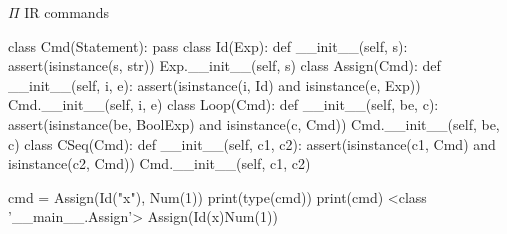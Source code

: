 \documentclass{beamer}
\begin{document}

\begin{frame}{{\color{red}$\Pi$ IR} commands}

\begin{adjustbox}{width=0.8\textwidth}
\begin{python}
class Cmd(Statement): pass
class Id(Exp):
    def __init__(self, s):
        assert(isinstance(s, str))
        Exp.__init__(self, s)
class Assign(Cmd):
    def __init__(self, i, e): 
        assert(isinstance(i, Id) and isinstance(e, Exp))
        Cmd.__init__(self, i, e)
class Loop(Cmd):
    def __init__(self, be, c):
        assert(isinstance(be, BoolExp) and isinstance(c, Cmd))
        Cmd.__init__(self, be, c)
class CSeq(Cmd):
    def __init__(self, c1, c2):
        assert(isinstance(c1, Cmd) and isinstance(c2, Cmd))
        Cmd.__init__(self, c1, c2)
\end{python}
\end{adjustbox}

\framebreak
        
\begin{python}
cmd = Assign(Id("x"), Num(1))
print(type(cmd))
print(cmd)
<class '__main__.Assign'>
Assign(Id(x)Num(1))
\end{python}
\end{frame}

\end{document}
